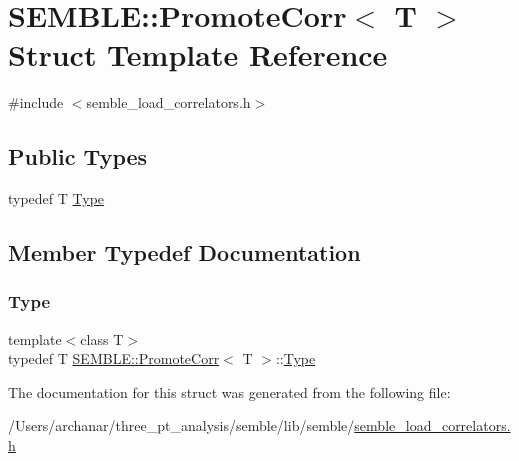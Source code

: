 \hypertarget{structSEMBLE_1_1PromoteCorr}{}\section{S\+E\+M\+B\+LE\+:\+:Promote\+Corr$<$ T $>$ Struct Template Reference}
\label{structSEMBLE_1_1PromoteCorr}


{\ttfamily \#include $<$semble\+\_\+load\+\_\+correlators.\+h$>$}

\subsection*{Public Types}
\begin{DoxyCompactItemize}
\item 
typedef T \mbox{\hyperlink{structSEMBLE_1_1PromoteCorr_afc4c1d2453a8a339755c4a29d4a36e51}{Type}}
\end{DoxyCompactItemize}


\subsection{Member Typedef Documentation}
\mbox{\label{structSEMBLE_1_1PromoteCorr_afc4c1d2453a8a339755c4a29d4a36e51}} 
\subsubsection{\texorpdfstring{Type}{Type}}
{\footnotesize\ttfamily template$<$class T$>$ \\
typedef T \mbox{\hyperlink{structSEMBLE_1_1PromoteCorr}{S\+E\+M\+B\+L\+E\+::\+Promote\+Corr}}$<$ T $>$\+::\mbox{\hyperlink{structSEMBLE_1_1PromoteCorr_afc4c1d2453a8a339755c4a29d4a36e51}{Type}}}



The documentation for this struct was generated from the following file\+:\begin{DoxyCompactItemize}
\item 
/\+Users/archanar/three\+\_\+pt\+\_\+analysis/semble/lib/semble/\mbox{\hyperlink{semble__load__correlators_8h}{semble\+\_\+load\+\_\+correlators.\+h}}\end{DoxyCompactItemize}
